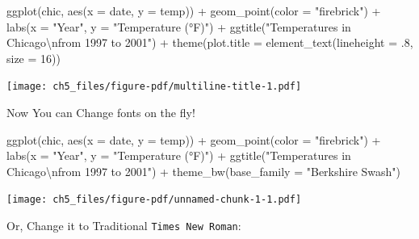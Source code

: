\documentclass[
  letterpaper,
]{scrbook}
\newenvironment{Shaded}{\begin{snugshade}}{\end{snugshade}}
\newcommand{\AttributeTok}[1]{\textcolor[rgb]{0.40,0.45,0.13}{#1}}
\newcommand{\DecValTok}[1]{\textcolor[rgb]{0.68,0.00,0.00}{#1}}
\newcommand{\FunctionTok}[1]{\textcolor[rgb]{0.28,0.35,0.67}{#1}}
\newcommand{\NormalTok}[1]{\textcolor[rgb]{0.00,0.23,0.31}{#1}}
\newcommand{\SpecialCharTok}[1]{\textcolor[rgb]{0.37,0.37,0.37}{#1}}
\newcommand{\StringTok}[1]{\textcolor[rgb]{0.13,0.47,0.30}{#1}}
\begin{document}
\begin{Shaded}
\begin{Highlighting}[]
\FunctionTok{ggplot}\NormalTok{(chic, }\FunctionTok{aes}\NormalTok{(}\AttributeTok{x =}\NormalTok{ date, }\AttributeTok{y =}\NormalTok{ temp)) }\SpecialCharTok{+}
  \FunctionTok{geom\_point}\NormalTok{(}\AttributeTok{color =} \StringTok{"firebrick"}\NormalTok{) }\SpecialCharTok{+}
  \FunctionTok{labs}\NormalTok{(}\AttributeTok{x =} \StringTok{"Year"}\NormalTok{, }\AttributeTok{y =} \StringTok{"Temperature (°F)"}\NormalTok{) }\SpecialCharTok{+}
  \FunctionTok{ggtitle}\NormalTok{(}\StringTok{"Temperatures in Chicago}\SpecialCharTok{\textbackslash{}n}\StringTok{from 1997 to 2001"}\NormalTok{) }\SpecialCharTok{+}
  \FunctionTok{theme}\NormalTok{(}\AttributeTok{plot.title =} \FunctionTok{element\_text}\NormalTok{(}\AttributeTok{lineheight =}\NormalTok{ .}\DecValTok{8}\NormalTok{, }\AttributeTok{size =} \DecValTok{16}\NormalTok{))}
\end{Highlighting}
\end{Shaded}

\texttt{[image: ch5\_files/figure-pdf/multiline-title-1.pdf]}

Now You can Change fonts on the fly!

\begin{Shaded}
\begin{Highlighting}[]
\FunctionTok{ggplot}\NormalTok{(chic, }\FunctionTok{aes}\NormalTok{(}\AttributeTok{x =}\NormalTok{ date, }\AttributeTok{y =}\NormalTok{ temp)) }\SpecialCharTok{+}
    \FunctionTok{geom\_point}\NormalTok{(}\AttributeTok{color =} \StringTok{"firebrick"}\NormalTok{) }\SpecialCharTok{+}
    \FunctionTok{labs}\NormalTok{(}\AttributeTok{x =} \StringTok{"Year"}\NormalTok{, }\AttributeTok{y =} \StringTok{"Temperature (°F)"}\NormalTok{) }\SpecialCharTok{+}
    \FunctionTok{ggtitle}\NormalTok{(}\StringTok{"Temperatures in Chicago}\SpecialCharTok{\textbackslash{}n}\StringTok{from 1997 to 2001"}\NormalTok{) }\SpecialCharTok{+}
    \FunctionTok{theme\_bw}\NormalTok{(}\AttributeTok{base\_family =} \StringTok{"Berkshire Swash"}\NormalTok{)}
\end{Highlighting}
\end{Shaded}

\texttt{[image: ch5\_files/figure-pdf/unnamed-chunk-1-1.pdf]}

Or, Change it to Traditional \texttt{Times\ New\ Roman}:
\end{document}

